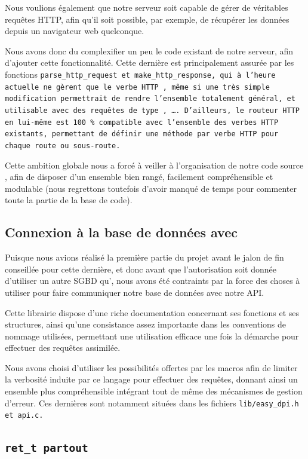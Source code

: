 \documentclass[a4paper, 11pt, twoside]{book}
\begin{document}
Nous voulions également que notre serveur soit capable de gérer de véritables requêtes HTTP, afin qu'il soit possible, par exemple, de récupérer les données depuis un navigateur web quelconque.

Nous avons donc du complexifier un peu le code existant de notre serveur, afin d'ajouter cette fonctionnalité. Cette dernière est principalement assurée par les fonctions \tt{parse\_http\_request} et \tt{make\_http\_response}, qui à l'heure actuelle ne gèrent que le verbe HTTP , même si une très simple modification permettrait de rendre l'ensemble totalement général, et utilisable avec des requêtes de type , \ldots{}. D'ailleurs, le routeur HTTP en lui-même est 100~\% compatible avec l'ensemble des verbes HTTP existants, permettant de définir une méthode par verbe HTTP pour chaque route ou sous-route.

Cette ambition globale nous a forcé à veiller à l'organisation de notre code source , afin de disposer d'un ensemble bien rangé, facilement compréhensible et modulable (nous regrettons toutefois d'avoir manqué de temps pour commenter toute la partie  de la base de code).

\subsection{Connexion à la base de données avec }

Puisque nous avions réalisé la première partie du projet avant le jalon de fin conseillée pour cette dernière, et donc avant que l'autorisation soit donnée d'utiliser un autre SGBD qu', nous avons été contraints par la force des choses à utiliser  pour faire communiquer notre base de données avec notre API.

Cette librairie  dispose d'une riche documentation concernant ses fonctions et ses structures, ainsi qu'une consistance assez importante dans les conventions de nommage utilisées, permettant une utilisation efficace une fois la démarche pour effectuer des requêtes assimilée.

Nous avons choisi d'utiliser les possibilités offertes par les macros  afin de limiter la verbosité induite par ce langage pour effectuer des requêtes, donnant ainsi un ensemble plus compréhensible intégrant tout de même des mécanismes de gestion d'erreur. Ces dernières sont notamment situées dans les fichiers \tt{lib/easy\_dpi.h} et \tt{api.c}.

\subsection{\tt{ret\_t} partout}
\end{document}
